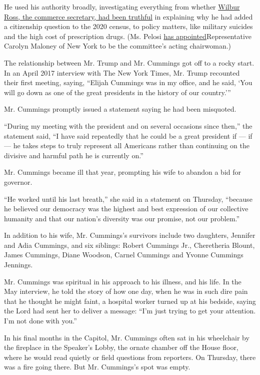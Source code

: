 He used his authority broadly, investigating everything from whether
\href{https://www.baltimoresun.com/news/maryland/politics/bs-md-census-cummings-citizenship-question-20190314-story.html}{Wilbur
Ross, the commerce secretary, had been truthful} in explaining why he
had added a citizenship question to the 2020 census, to policy matters,
like military suicides and the high cost of prescription drugs. (Ms.
Pelosi
\href{https://www.nytimes.com/2019/10/17/us/politics/donald-trump-impeachment-news.html}{has
appointed}Representative Carolyn Maloney of New York to be the
committee's acting chairwoman.)

The relationship between Mr. Trump and Mr. Cummings got off to a rocky
start. In an April 2017 interview with The New York Times, Mr. Trump
recounted their first meeting, saying, ``Elijah Cummings was in my
office, and he said, `You will go down as one of the great presidents in
the history of our country.'''

Mr. Cummings promptly issued a statement saying he had been misquoted.

``During my meeting with the president and on several occasions since
then,'' the statement said, ``I have said repeatedly that he could be a
great president if --- if --- he takes steps to truly represent all
Americans rather than continuing on the divisive and harmful path he is
currently on.''

Mr. Cummings became ill that year, prompting his wife to abandon a bid
for governor.

``He worked until his last breath,'' she said in a statement on
Thursday, ``because he believed our democracy was the highest and best
expression of our collective humanity and that our nation's diversity
was our promise, not our problem.''

In addition to his wife, Mr. Cummings's survivors include two daughters,
Jennifer and Adia Cummings, and six siblings: Robert Cummings Jr.,
Cheretheria Blount, James Cummings, Diane Woodson, Carnel Cummings and
Yvonne Cummings Jennings.

Mr. Cummings was spiritual in his approach to his illness, and his life.
In the May interview, he told the story of how one day, when he was in
such dire pain that he thought he might faint, a hospital worker turned
up at his bedside, saying the Lord had sent her to deliver a message:
``I'm just trying to get your attention. I'm not done with you.''

In his final months in the Capitol, Mr. Cummings often sat in his
wheelchair by the fireplace in the Speaker's Lobby, the ornate chamber
off the House floor, where he would read quietly or field questions from
reporters. On Thursday, there was a fire going there. But Mr. Cummings's
spot was empty.

